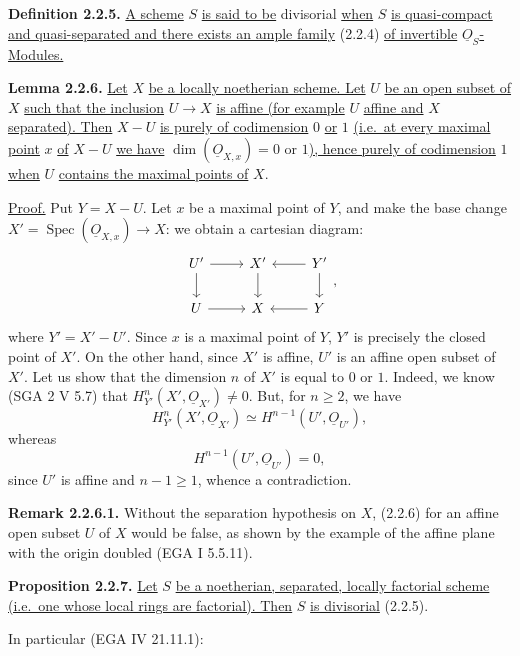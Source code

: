 \textbf{Definition 2.2.5.} \uline{A scheme} $S$ \uline{is said to be} divisorial \uline{when} $S$ \uline{is quasi-compact and quasi-separated and there exists an ample family} (2.2.4) \uline{of invertible} $\underline{O}_S$\uline{-Modules.}

\textbf{Lemma 2.2.6.} \uline{Let} $X$ \uline{be a locally noetherian scheme. Let} $U$ \uline{be an open subset of} $X$ \uline{such that the inclusion} $U\to X$ \uline{is affine (for example} $U$ \uline{affine and} $X$ \uline{separated). Then} $X-U$ \uline{is purely of codimension} $0$ \uline{or} $1$ \uline{(i.e.\ at every maximal point} $x$ \uline{of} $X-U$ \uline{we have} $\dim(\underline{O}_{X,x})=0$ or $1$\uline{), hence purely of codimension} $1$ \uline{when} $U$ \uline{contains the maximal points of} $X$.

\uline{Proof.} Put $Y=X-U$. Let $x$ be a maximal point of $Y$, and make the base change $X'=\operatorname{Spec}(\underline{O}_{X,x})\to X$: we obtain a cartesian diagram:
\[
\begin{tikzcd}
U' \arrow[r] \arrow[d] & X' \arrow[d] & Y' \arrow[l] \arrow[d] \\
U \arrow[r] & X & Y \arrow[l]
\end{tikzcd},
\]
where $Y'=X'-U'$. Since $x$ is a maximal point of $Y$, $Y'$ is precisely the closed point of $X'$. On the other hand, since $X'$ is affine, $U'$ is an affine open subset of $X'$. Let us show that the dimension $n$ of $X'$ is equal to $0$ or $1$. Indeed, we know (SGA 2 V 5.7) that $H^n_{Y'}(X',\underline{O}_{X'})\ne0$. But, for $n\ge2$, we have
\[
H^n_{Y'}(X',\underline{O}_{X'})\simeq H^{n-1}(U',\underline{O}_{U'}),
\]
whereas
\[
H^{n-1}(U',\underline{O}_{U'})=0,
\]
%
since $U'$ is affine and $n-1\ge1$, whence a contradiction.

\textbf{Remark 2.2.6.1.} Without the separation hypothesis on $X$, (2.2.6) for an affine open subset $U$ of $X$ would be false, as shown by the example of the affine plane with the origin doubled (EGA I 5.5.11).

\textbf{Proposition 2.2.7.} \uline{Let} $S$ \uline{be a noetherian, separated, locally factorial scheme (i.e.\ one whose local rings are factorial). Then} $S$ \uline{is divisorial} (2.2.5).

In particular (EGA IV 21.11.1):

